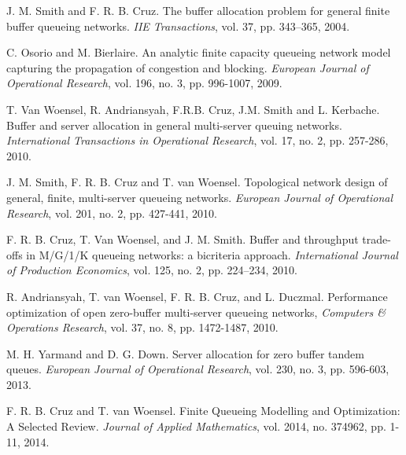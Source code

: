 \documentclass[twoside]{article}
\begin{document}
\begin{multicols}{2}
\begin{thebibliography}{9}
J. M. Smith and F. R. B. Cruz. The buffer allocation problem for general finite buffer queueing networks. \textit{IIE Transactions}, vol. 37, pp. 343–365, 2004.

C. Osorio and M. Bierlaire. An analytic finite capacity queueing network model capturing the propagation of congestion and blocking. \textit{European Journal of Operational Research}, vol. 196, no. 3, pp. 996-1007, 2009.

T. Van Woensel, R. Andriansyah, F.R.B. Cruz, J.M. Smith and L. Kerbache. Buffer and server allocation in general multi-server queuing networks. \textit{International Transactions in Operational Research}, vol. 17, no. 2,  pp. 257-286, 2010.

J. M. Smith, F. R. B. Cruz and T. van Woensel. Topological network design of general, finite, multi-server queueing networks. \textit{European Journal of Operational Research}, vol. 201, no. 2, pp. 427-441, 2010.

F. R. B. Cruz, T. Van Woensel, and J. M. Smith. Buffer and throughput trade-offs in M/G/1/K queueing networks: a bicriteria approach. \textit{International Journal of Production Economics}, vol. 125, no. 2, pp. 224–234, 2010.

R. Andriansyah, T. van Woensel, F. R. B. Cruz, and L. Duczmal. Performance optimization of open zero-buffer multi-server queueing networks, \textit{Computers \& Operations Research}, vol. 37, no. 8, pp. 1472-1487, 2010.

  M. H. Yarmand and D. G. Down. Server allocation for zero buffer tandem queues. \textit{European Journal of Operational Research}, vol. 230, no. 3, pp. 596-603, 2013. 

  F. R. B. Cruz and T. van Woensel. Finite Queueing Modelling and Optimization: A Selected Review. \textit{Journal of Applied Mathematics}, vol. 2014,  no. 374962, pp. 1-11, 2014.


\end{thebibliography}
\end{multicols}
\end{document}
